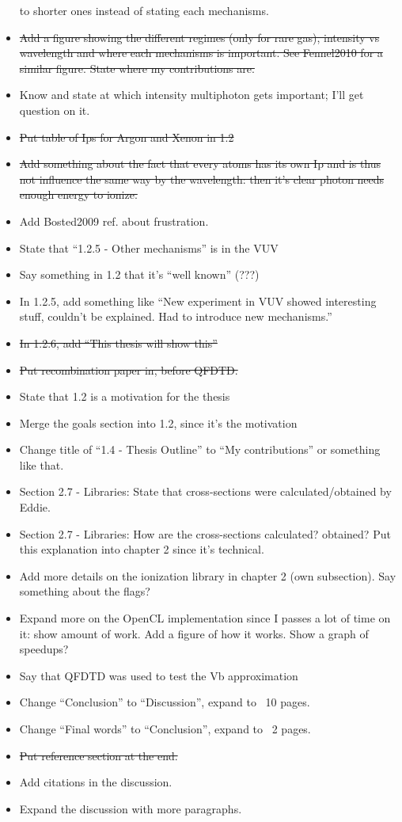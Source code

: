 \begin{itemize}
to shorter ones instead of stating each mechanisms.
\item \sout{Add a figure showing the different regimes (only for rare gas), intensity
vs wavelength and where each mechanisms is important. See Fennel2010 for a
similar figure. State where my contributions are.}
\item Know and state at which intensity multiphoton gets important; I'll get
question on it.
\item \sout{Put table of Ips for Argon and Xenon in 1.2}
\item \sout{Add something about the fact that every atoms has its own Ip and is thus
not influence the same way by the wavelength: then it's clear photon needs
enough energy to ionize.}
\item Add Bosted2009 ref. about frustration.
\item State that ``1.2.5 - Other mechanisms'' is in the VUV
\item Say something in 1.2 that it's ``well known'' (???)
\item In 1.2.5, add something like ``New experiment in VUV showed interesting
stuff, couldn't be explained. Had to introduce new mechanisms.''
\item \sout{In 1.2.6, add ``This thesis will show this''}
\item \sout{Put recombination paper in, before QFDTD.}
\item State that 1.2 is a motivation for the thesis
\item Merge the goals section into 1.2, since it's the motivation
\item Change title of ``1.4 - Thesis Outline'' to ``My contributions'' or
something like that.
\item Section 2.7 - Libraries: State that cross-sections were calculated/obtained
by Eddie.
\item Section 2.7 - Libraries: How are the cross-sections calculated? obtained?
Put this explanation into chapter 2 since it's technical.
\item Add more details on the ionization library in chapter 2 (own subsection).
Say something about the flags?
\item Expand more on the OpenCL implementation since I passes a lot of time on
it: show amount of work. Add a figure of how it works. Show a graph of speedups?
\item Say that QFDTD was used to test the Vb approximation
\item Change ``Conclusion'' to ``Discussion'', expand to ~10 pages.
\item Change ``Final words'' to ``Conclusion'', expand to ~2 pages.
\item \sout{Put reference section at the end.}
\item Add citations in the discussion.
\item Expand the discussion with more paragraphs.
\end{itemize}
